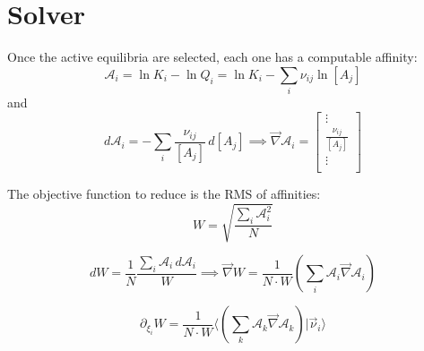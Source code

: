 \documentclass[aps,12pt]{revtex4}
\begin{document}
\section{Solver}

Once the active equilibria are selected, each one has a computable 
affinity:
\begin{equation}
\label{eq:affinity}
	\mathcal A_i = \ln K_i - \ln Q_i = \ln K_i -  \sum_{i} \nu_{ij} \ln [A_j] %
\end{equation}
and
\begin{equation}
	d \mathcal A_i = - \sum_i \dfrac{\nu_{ij}}{[A_j]} \, d[A_j] \implies
	 \vec \nabla \mathcal A_i = 
	\begin{bmatrix}
	\vdots\\
	\frac{\nu_{ij}}{[A_j]}\\
	\vdots\\
	\end{bmatrix}
\end{equation}

The objective function to reduce is the RMS of affinities:
\begin{equation}
	W = \sqrt{ \dfrac{\sum_i \mathcal A_i^2}{N} } 
\end{equation}

\begin{equation}
	dW = \dfrac{1}{N} \dfrac{\sum_i \mathcal A_i \, d \mathcal A_i}{W}
	\implies
	\vec \nabla W = \dfrac{1}{N\cdot W} \left( \sum_i \mathcal A_i \vec \nabla \mathcal A_i \right)
\end{equation}

\begin{equation}
\partial_{\xi_i} W = \dfrac{1}{N\cdot W} \langle \left( \sum_k \mathcal A_k \vec \nabla \mathcal A_k \right) \vert \vec \nu_i \rangle
\end{equation}
\end{document}
